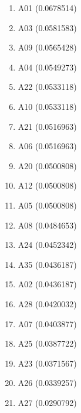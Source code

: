 \begin{enumerate}
\item A01 (0.0678514)
\item A03 (0.0581583)
\item A09 (0.0565428)
\item A04 (0.0549273)
\item A22 (0.0533118)
\item A10 (0.0533118)
\item A21 (0.0516963)
\item A06 (0.0516963)
\item A20 (0.0500808)
\item A12 (0.0500808)
\item A05 (0.0500808)
\item A08 (0.0484653)
\item A24 (0.0452342)
\item A35 (0.0436187)
\item A02 (0.0436187)
\item A28 (0.0420032)
\item A07 (0.0403877)
\item A25 (0.0387722)
\item A23 (0.0371567)
\item A26 (0.0339257)
\item A27 (0.0290792)
\end{enumerate}